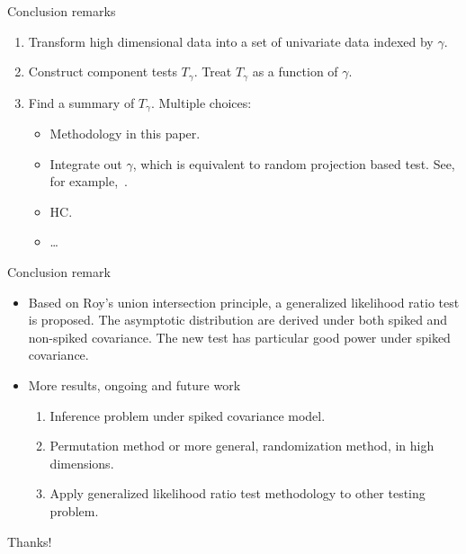 \documentclass{beamer}
\theoremstyle{plain}
\theoremstyle{definition}
\theoremstyle{remark}
\begin{document}
\begin{frame}{Conclusion remarks}

    \begin{enumerate}
    \item
        Transform high dimensional data into a set of univariate data indexed by $\gamma$.
    \item
        Construct component tests $T_{\gamma}$. Treat $T_{\gamma}$ as a function of $\gamma$.
    \item
        Find a summary of $T_{\gamma}$. Multiple choices:
            \begin{itemize}
                \item
                    Methodology in this paper.
                \item
                    Integrate out $\gamma$, which is equivalent to random projection based test. See, for example,~\cite{Thulin2014A}.
                \item
                    HC.\
                \item
                    \ldots
            \end{itemize}
    \end{enumerate}

\end{frame}


\begin{frame}{Conclusion remark}
    \begin{itemize}
        \item
            Based on Roy's union intersection principle, a generalized likelihood ratio test is proposed.
            The asymptotic distribution are derived under both spiked and non-spiked covariance.
            The new test has particular good power under spiked covariance.
        \item
            More results, ongoing and future work
            \begin{enumerate}
            \item
                Inference problem under spiked covariance model.
            \item
                Permutation method or more general, randomization method, in high dimensions.
            \item
                Apply generalized likelihood ratio test methodology to other testing problem.
            \end{enumerate}
    \end{itemize}
\end{frame}
\begin{frame}
    \begin{center}\huge
    Thanks!\end{center}
\end{frame}

\end{document}
